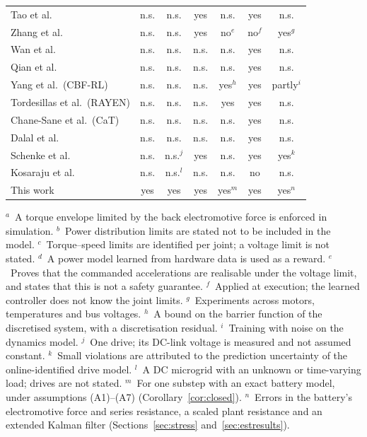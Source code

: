 \begin{table}[tbp]
{{\begin{tabular}{lcccccc}
Tao et al.\ \cite{tao2026actuator} & n.s. & n.s. & yes & n.s. & yes & n.s. \\
Zhang et al.\ \cite{zhang2026vra} & n.s. & n.s. & yes & no$^{e}$ & no$^{f}$ & yes$^{g}$ \\
Wan et al.\ \cite{wan2026thermal} & n.s. & n.s. & n.s. & n.s. & yes & n.s. \\
Qian et al.\ \cite{qian2026thermal} & n.s. & n.s. & n.s. & n.s. & yes & n.s. \\
Yang et al.\ (CBF-RL) \cite{yang2026cbfrl} & n.s. & n.s. & n.s. & yes$^{h}$ & yes & partly$^{i}$ \\
Tordesillas et al.\ (RAYEN) \cite{tordesillas2023rayen} & n.s. & n.s. & n.s. & yes & yes & n.s. \\
Chane-Sane et al.\ (CaT) \cite{chanesane2024cat} & n.s. & n.s. & n.s. & n.s. & yes & n.s. \\
Dalal et al.\ \cite{dalal2018safety} & n.s. & n.s. & n.s. & n.s. & yes & n.s. \\
Schenke et al.\ \cite{schenke2023safe} & n.s. & n.s.$^{j}$ & yes & n.s. & yes & yes$^{k}$ \\
Kosaraju et al.\ \cite{kosaraju2022microgrid} & n.s. & n.s.$^{l}$ & n.s. & n.s. & no & n.s. \\
\midrule
This work & yes & yes & yes & yes$^{m}$ & yes & yes$^{n}$ \\
\bottomrule\end{tabular}}}
\par\smallskip\parbox{\linewidth}{\footnotesize
$^{a}$~A torque envelope limited by the back electromotive force is enforced in simulation.
$^{b}$~Power distribution limits are stated not to be included in the model.
$^{c}$~Torque--speed limits are identified per joint; a voltage limit is not stated.
$^{d}$~A power model learned from hardware data is used as a reward.
$^{e}$~Proves that the commanded accelerations are realisable under the voltage limit, and states that this is not a safety guarantee.
$^{f}$~Applied at execution; the learned controller does not know the joint limits.
$^{g}$~Experiments across motors, temperatures and bus voltages.
$^{h}$~A bound on the barrier function of the discretised system, with a discretisation residual.
$^{i}$~Training with noise on the dynamics model.
$^{j}$~One drive; its DC-link voltage is measured and not assumed constant.
$^{k}$~Small violations are attributed to the prediction uncertainty of the online-identified drive model.
$^{l}$~A DC microgrid with an unknown or time-varying load; drives are not stated.
$^{m}$~For one substep with an exact battery model, under assumptions (A1)--(A7) (Corollary~\ref{cor:closed}).
$^{n}$~Errors in the battery's electromotive force and series resistance, a scaled plant resistance and an extended Kalman filter (Sections~\ref{sec:stress} and~\ref{sec:estresults}).}
\end{table}
